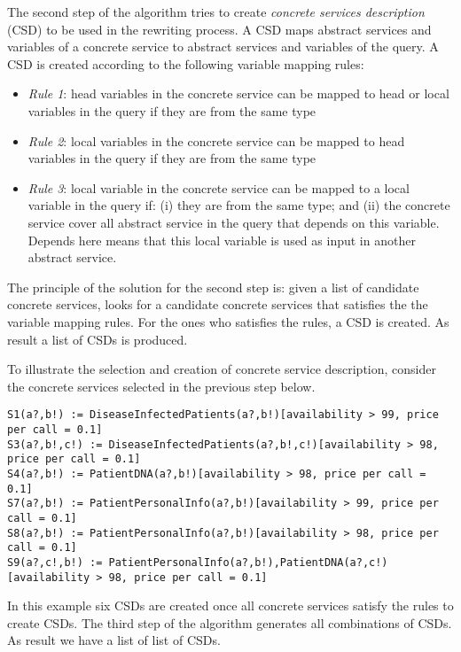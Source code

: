 \documentclass{sig-alternate}
\begin{document}
The second step of the algorithm tries to create \textit{concrete services description} (CSD) to be used in the rewriting process. A CSD maps abstract services and variables of a concrete service to abstract services and variables of the query. A CSD is created according to the following variable mapping rules:
\begin{itemize}
\item \textit{Rule 1}: head variables in the concrete service can be mapped to head or local variables in the query if they are from the same type
\item \textit{Rule 2}: local variables in the concrete service can be mapped to head variables in the query if they are from the same type
\item \textit{Rule 3}: local variable in the concrete service can be mapped to a local variable in the query if: (i) they are from the same type; and (ii) the concrete service cover all abstract service in the query that depends on this variable. Depends here means that this local variable is used as input in another abstract service.
\end{itemize}

The principle of the solution for the second step is: given a list of candidate concrete services, looks for a candidate concrete services that satisfies the the variable mapping rules. For the ones who satisfies the rules, a CSD is created. As result a list of CSDs is produced.

To illustrate the selection and creation of concrete service description, consider the concrete services selected in the previous step below.
\begin{tiny}
\begin{verbatim}
S1(a?,b!) := DiseaseInfectedPatients(a?,b!)[availability > 99, price per call = 0.1]
S3(a?,b!,c!) := DiseaseInfectedPatients(a?,b!,c!)[availability > 98, price per call = 0.1]
S4(a?,b!) := PatientDNA(a?,b!)[availability > 98, price per call = 0.1]
S7(a?,b!) := PatientPersonalInfo(a?,b!)[availability > 99, price per call = 0.1]
S8(a?,b!) := PatientPersonalInfo(a?,b!)[availability > 98, price per call = 0.1]
S9(a?,c!,b!) := PatientPersonalInfo(a?,b!),PatientDNA(a?,c!)[availability > 98, price per call = 0.1] 
\end{verbatim}
\end{tiny}

In this example six CSDs are created once all concrete services satisfy the rules to create CSDs. The third step of the algorithm generates all combinations of CSDs. As result we have a list of list of CSDs.
\end{document}
